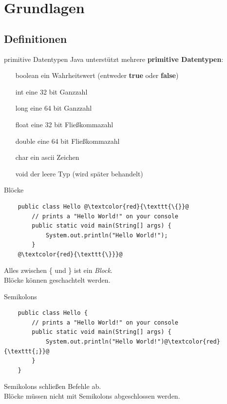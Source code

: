 \section{Grundlagen}
\subsection{Definitionen}

\begin{frame}{primitive Datentypen}
	Java unterstützt mehrere \textbf{primitive Datentypen}:
	\begin{itemize}
		\item[boolean] ein Wahrheitswert (entweder \textbf{true} oder \textbf{false})
		\item[int] eine 32 bit Ganzzahl
		\item[long] eine 64 bit Ganzzahl
		\item[float] eine 32 bit Fließkommazahl
		\item[double] eine 64 bit Fließkommazahl
		\item[char] ein ascii Zeichen
		\item[void] der leere Typ (wird später behandelt)
	\end{itemize}
\end{frame}

\begin{frame}[fragile]{Blöcke}
	\begin{lstlisting}
	public class Hello @\textcolor{red}{\texttt{\{}}@
	    // prints a "Hello World!" on your console
	    public static void main(String[] args) {
	        System.out.println("Hello World!");
	    }
	@\textcolor{red}{\texttt{\}}}@
	\end{lstlisting}
	Alles zwischen \{ und \} ist ein \emph{Block}. \\
	Blöcke können geschachtelt werden.
\end{frame}

\begin{frame}[fragile]{Semikolons}
	\begin{lstlisting}
	public class Hello {
	    // prints a "Hello World!" on your console
	    public static void main(String[] args) {
	        System.out.println("Hello World!")@\textcolor{red}{\texttt{;}}@
	    }
	}
	\end{lstlisting}
	Semikolons schließen Befehle ab. \\
	Blöcke müssen nicht mit Semikolons abgeschlossen werden.
\end{frame}

